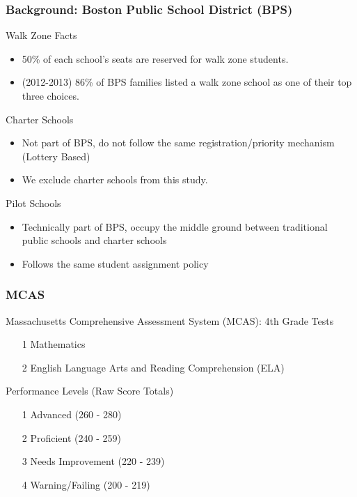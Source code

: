 \documentclass{beamer}
\begin{document}
\begin{frame}
\label{Background: BPS}
\frametitle{Background: Boston Public School District (BPS)}
Walk Zone Facts
\begin{itemize}
\item 50\% of each school's seats are reserved for walk zone students.
\item (2012-2013) 86\% of BPS families listed a walk zone school as one of their top three choices.
\newline
\end{itemize}

Charter Schools
\begin{itemize}
\item Not part of BPS, do not follow the same registration/priority mechanism (Lottery Based)
\item We exclude charter schools from this study. \newline
\end{itemize}

Pilot Schools
\begin{itemize}
\item Technically part of BPS, occupy the middle ground between traditional public schools and charter schools
\item Follows the same student assignment policy
\end{itemize}
\end{frame}

\begin{frame}
\label{Background: MCAS}
\frametitle{MCAS}
Massachusetts Comprehensive Assessment System (MCAS): 4th Grade Tests
\begin{itemize}
\item[1] Mathematics
\item[2] English Language Arts and Reading Comprehension (ELA) \newline
\end{itemize}

Performance Levels (Raw Score Totals)
\begin{itemize}
\item[1] Advanced (260 - 280)
\item[2] Proficient (240 - 259)
\item[3] Needs Improvement (220 - 239)
\item[4] Warning/Failing (200 - 219) 
\end{itemize}
\end{frame}
\end{document}
